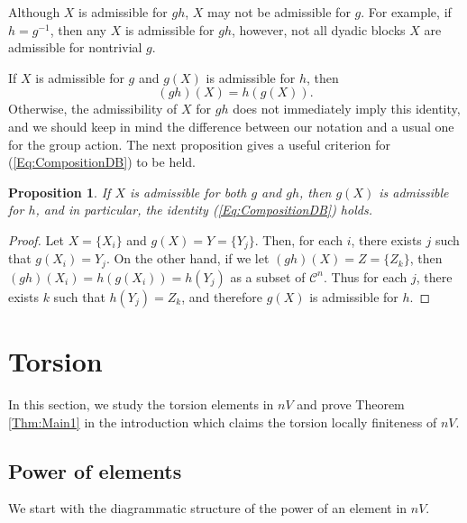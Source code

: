 \documentclass[12pt,reqno]{amsart}
\theoremstyle{plain}
\newtheorem{proposition}[theorem]{Proposition}
\theoremstyle{definition}
\theoremstyle{remark}
\numberwithin{equation}{section}
\begin{document}
Although  $X$  is admissible for  $gh$,  
$X$  may not be admissible for  $g$.  
For example, 
if  $h = g^{-1}$,  
then any  $X$  is admissible for  $gh$,  
however, not all dyadic blocks  $X$  are 
admissible for nontrivial  $g$.   

If  $X$  is admissible for  $g$  and  $g(X)$  is admissible for  $h$, 
then  
\begin{equation}\label{Eq:CompositionDB} 
	(gh)(X) = h(g(X)). 
\end{equation}   
Otherwise, 
the admissibility of  $X$  for  $gh$  does not immediately imply 
this identity, 
and we should keep in mind the difference between our notation and 
a usual one for the group action.  
The next proposition gives a useful criterion for   
(\ref{Eq:CompositionDB})  to be held.  

\begin{proposition}\label{Prop:CompositionDB}  
	If  $X$  is admissible for both  $g$  and  $gh$, 
	then  $g(X)$  is admissible for  $h$,  
	and in particular, 
	the identity  {\em (\ref{Eq:CompositionDB})}  holds. 
\end{proposition}
\begin{proof} 
	Let  $X = \{ X_i \}$  and  $g(X) = Y = \{ Y_j \}$.  
	Then, 
	for each  $i$, 
	there exists  $j$  such that  $g(X_i) = Y_j$.  
	On the other hand, 
	if we let  $(gh)(X) = Z = \{Z_k \}$, 
	then 
	$(gh)(X_i) = h(g(X_i)) = h(Y_j)$  as a subset of $\mathcal{C}^n$.   
	Thus for each  $j$,  
	there exists  $k$  such that  
	$h(Y_j) = Z_k$,     
	and therefore  $g(X)$  is admissible for  $h$.     
\end{proof} 



%
%
\medskip 
\section{Torsion}\label{Sec:Torsion} 

In this section, 
we study the torsion elements in $nV$  and prove Theorem \ref{Thm:Main1} in the introduction 
which claims the torsion locally finiteness of  $nV$.  


\subsection{Power of elements} 

We start with the diagrammatic structure of the power of an element in  $nV$.  
\end{document}
